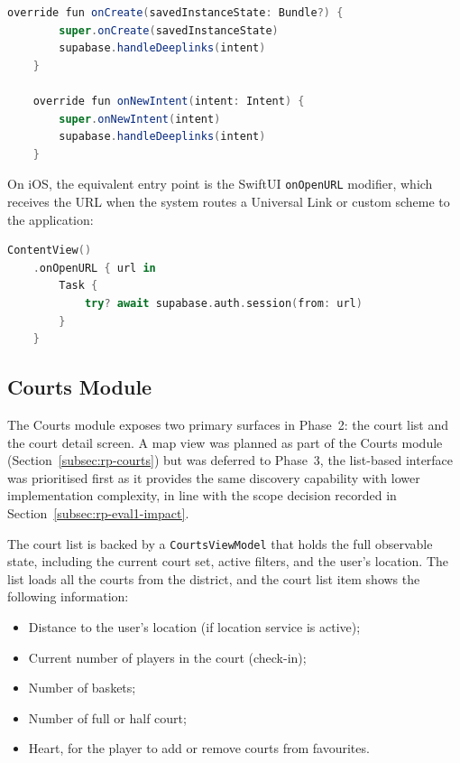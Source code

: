 \begin{lstlisting}[language=java, caption={Deep link handling — androidApp/MainActivity.kt}]
	override fun onCreate(savedInstanceState: Bundle?) {
		super.onCreate(savedInstanceState)
		supabase.handleDeeplinks(intent)
	}
	
	override fun onNewIntent(intent: Intent) {
		super.onNewIntent(intent)
		supabase.handleDeeplinks(intent)
	}
\end{lstlisting}

On iOS, the equivalent entry point is the SwiftUI \texttt{onOpenURL} modifier, which receives the URL when the system routes a Universal Link or custom scheme to the application:

\begin{lstlisting}[language=swift, caption={Deep link handling — iosApp/iOSApp.swift}]
	ContentView()
	.onOpenURL { url in
		Task {
			try? await supabase.auth.session(from: url)
		}
	}
\end{lstlisting}

\subsection{Courts Module}


The Courts module exposes two primary surfaces in Phase~2: the court list and the court detail screen.
A map view was planned as part of the Courts module (Section~\ref{subsec:rp-courts}) but was deferred to Phase~3, the list-based interface was prioritised first as it provides the same discovery capability with lower implementation complexity, in line with the scope decision recorded in Section~\ref{subsec:rp-eval1-impact}.

The court list is backed by a \texttt{CourtsViewModel} that holds the full observable state, including the current court set, active filters, and the user's location.
The list loads all the courts from the district, and the court list item shows the following information:
\begin{itemize}
	\item Distance to the user's location (if location service is active);
	\item Current number of players in the court (check-in);
	\item Number of baskets;
	\item Number of full or half court;
	\item Heart, for the player to add or remove courts from favourites.
\end{itemize}

